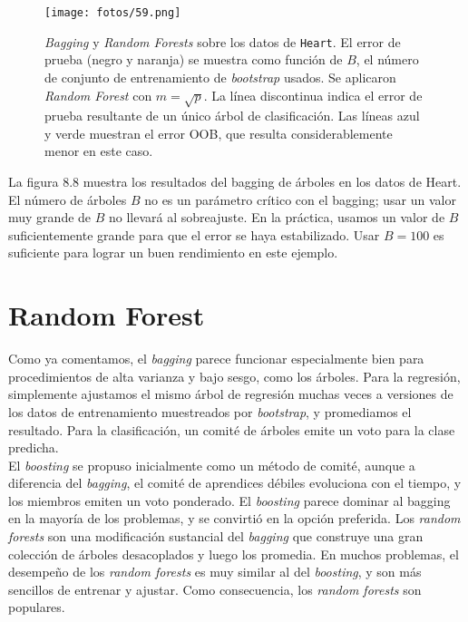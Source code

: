 \begin{figure}[h]
\centering
\texttt{[image: fotos/59.png]}
\caption{\textit{Bagging} y \textit{Random Forests} sobre los datos de \texttt{Heart}. El error de prueba (negro y naranja) se muestra como función de $B$, el número de conjunto de entrenamiento de \textit{bootstrap} usados. Se aplicaron \textit{Random Forest} con $m = \sqrt{p}$. La línea discontinua indica el error de prueba resultante de un único árbol de clasificación. Las líneas azul y verde muestran el error OOB, que resulta considerablemente menor en este caso. }
\label{fig:20.8}
\end{figure}

La figura 8.8 muestra los resultados del bagging de árboles en los datos de Heart. El número de árboles $B$ no es un parámetro crítico con el bagging; usar un valor muy grande de $B$ no llevará al sobreajuste. En la práctica, usamos un valor de $B$ suficientemente grande para que el error se haya estabilizado. Usar $B = 100$ es suficiente para lograr un buen rendimiento en este ejemplo.

\section{Random Forest}

Como ya comentamos, el \textit{bagging} parece funcionar especialmente bien para procedimientos de alta varianza y bajo sesgo, como los árboles. Para la regresión, simplemente ajustamos el mismo árbol de regresión muchas veces a versiones de los datos de entrenamiento muestreados por \textit{bootstrap}, y promediamos el resultado. Para la clasificación, un comité de árboles emite un voto para la clase predicha. \\

El \textit{boosting} se propuso inicialmente como un método de comité, aunque a diferencia del \textit{bagging}, el comité de aprendices débiles evoluciona con el tiempo, y los miembros emiten un voto ponderado. El \textit{boosting} parece dominar al bagging en la mayoría de los problemas, y se convirtió en la opción preferida. Los \textit{random forests} son una modificación sustancial del \textit{bagging} que construye una gran colección de árboles desacoplados y luego los promedia. En muchos problemas, el desempeño de los \textit{random forests} es muy similar al del \textit{boosting}, y son más sencillos de entrenar y ajustar. Como consecuencia, los \textit{random forests} son populares. 

